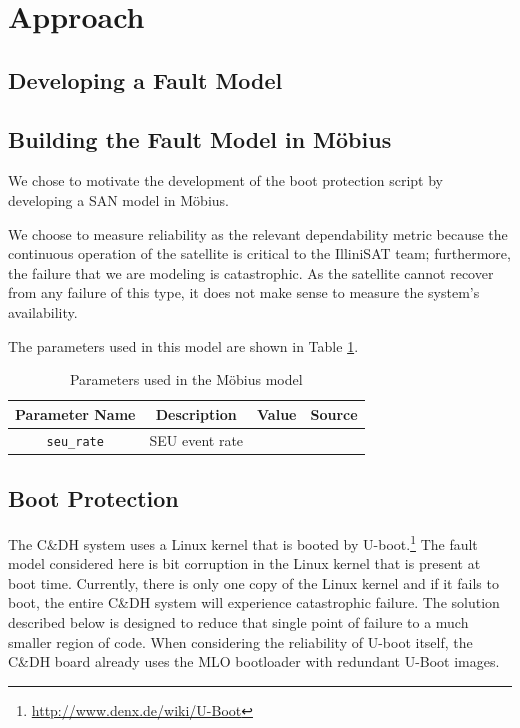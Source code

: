 \section{Approach}\label{sec:approach}

\subsection{Developing a Fault Model}\label{sec:developingmodel}


\subsection{Building the Fault Model in M\"obius}\label{sec:buildingmodel}

We chose to motivate the development of the boot protection script by developing a SAN model in M\"obius.

We choose to measure reliability as the relevant dependability metric because the continuous operation of the satellite is critical to the IlliniSAT team; furthermore, the failure that we are modeling is catastrophic.  As the satellite cannot recover from any failure of this type, it does not make sense to measure the system's availability.

The parameters used in this model are shown in Table \ref{tab:parameters}.

\begin{table}[width = 0.5\textwidth]
\centering
\begin{tabular}{|c|c|c|c|}
\hline
{\bf Parameter Name} & {\bf Description} & {\bf Value} & {\bf Source}\\
\hline
\texttt{seu\_rate} & SEU event rate & & \\
\hline
\end{tabular}
\caption{Parameters used in the M\"obius model}
\label{tab:parameters}
\end{table}
\subsection{Boot Protection}
The C\&DH system uses a Linux kernel that is booted by
U-boot.\footnote{\url{http://www.denx.de/wiki/U-Boot}} The fault model
considered here is bit corruption in the Linux kernel that is present at boot
time.  Currently, there is only one copy of the Linux kernel and if it fails to
boot, the entire C\&DH system will experience catastrophic failure.  The
solution described below is designed to reduce that single point of failure to a
much smaller region of code.  When considering the reliability of U-boot itself,
the C\&DH board already uses the MLO bootloader with redundant U-Boot images.

